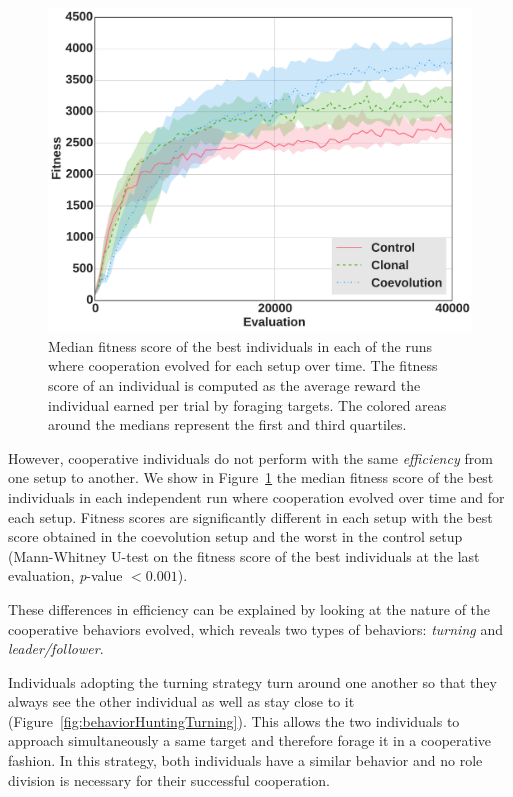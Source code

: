   \begin{figure}[hbtp]
    \begin{center}
      \includegraphics[scale = 0.30]{fig/ArticleRob1/fitnessHuntingStags.pdf}
      \caption{Median fitness score of the best individuals in each of the runs where cooperation evolved for each setup over time. The fitness score of an individual is computed as the average reward the individual earned per trial by foraging targets. The colored areas around the medians represent the first and third quartiles.} 
      \label{fig:HuntingFitness}
    \end{center}
  \end{figure}

  However, cooperative individuals do not perform with the same \emph{efficiency} from one setup to another. We show in Figure~\ref{fig:HuntingFitness} the median fitness score of the best individuals in each independent run where cooperation evolved over time and for each setup. Fitness scores are significantly different in each setup with the best score obtained in the coevolution setup and the worst in the control setup (Mann-Whitney U-test on the fitness score of the best individuals at the last evaluation, {\em p}-value $< 0.001$).

  These differences in efficiency can be explained by looking at the nature of the cooperative behaviors evolved, which reveals two types of behaviors: \emph{turning} and \emph{leader/follower}.

  Individuals adopting the turning strategy turn around one another so that they always see the other individual as well as stay close to it (Figure~\ref{fig:behaviorHuntingTurning}). This allows the two individuals to approach simultaneously a same target and therefore forage it in a cooperative fashion. In this strategy, both individuals have a similar behavior and no role division is necessary for their successful cooperation.

